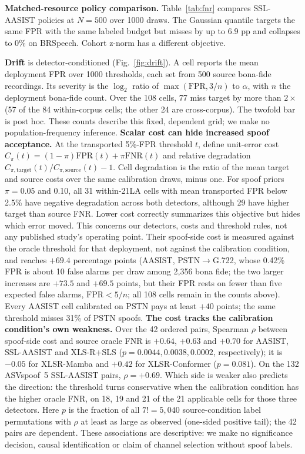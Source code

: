 \documentclass{article}
\begin{document}
\textbf{Matched-resource policy comparison.} Table~\ref{tab:fnr} compares SSL-AASIST policies at $N{=}500$ over 1000 draws. The Gaussian quantile targets the same FPR with the same labeled budget but misses by up to 6.9 pp and collapses to 0\% on BRSpeech. Cohort z-norm has a different objective.

\textbf{Drift} is detector-conditioned (Fig.~\ref{fig:drift}). A cell reports the mean deployment FPR over 1000 thresholds, each set from 500 source bona-fide recordings. Its severity is the $\log_2$ ratio of $\max(\mathrm{FPR},3/n)$ to $\alpha$, with $n$ the deployment bona-fide count. Over the 108 cells, 77 miss target by more than $2\times$ (57 of the 84 within-corpus cells; the other 24 are cross-corpus). The twofold bar is post hoc. These counts describe this fixed, dependent grid; we make no population-frequency inference. \textbf{Scalar cost can hide increased spoof acceptance.} At the transported 5\%-FPR threshold $t$, define unit-error cost $C_\pi(t)=(1-\pi)\mathrm{FPR}(t)+\pi\mathrm{FNR}(t)$ and relative degradation $C_{\pi,\mathrm{target}}(t)/C_{\pi,\mathrm{source}}(t)-1$. Cell degradation is the ratio of the mean target and source costs over the same calibration draws, minus one. For spoof priors $\pi=0.05$ and 0.10, all 31 within-21LA cells with mean transported FPR below 2.5\% have negative degradation across both detectors, although 29 have higher target than source FNR. Lower cost correctly summarizes this objective but hides which error moved. This concerns our detectors, costs and threshold rules, not any published study's operating point. Their spoof-side cost is measured against the oracle threshold for that deployment, not against the calibration condition, and reaches $+69.4$ percentage points (AASIST, PSTN$\to$G.722, whose 0.42\% FPR is about 10 false alarms per draw among 2,356 bona fide; the two larger increases are $+73.5$ and $+69.5$ points, but their FPR rests on fewer than five expected false alarms, $\mathrm{FPR}<5/n$; all 108 cells remain in the counts above). Every AASIST cell calibrated on PSTN pays at least $+40$ points; the same threshold misses 31\% of PSTN spoofs. \textbf{The cost tracks the calibration condition's own weakness.} Over the 42 ordered pairs, Spearman $\rho$ between spoof-side cost and source oracle FNR is $+0.64$, $+0.63$ and $+0.70$ for AASIST, SSL-AASIST and XLS-R+SLS ($p=0.0044,0.0038,0.0002$, respectively); it is $-0.05$ for XLSR-Mamba and $+0.42$ for XLSR-Conformer ($p=0.081$). On the 132 ASVspoof~5 SSL-AASIST pairs, $\rho=+0.69$. Which side is weaker also predicts the direction: the threshold turns conservative when the calibration condition has the higher oracle FNR, on 18, 19 and 21 of the 21 applicable cells for those three detectors. Here $p$ is the fraction of all $7!=5{,}040$ source-condition label permutations with $\rho$ at least as large as observed (one-sided positive tail); the 42 pairs are dependent. These associations are descriptive: we make no significance decision, causal identification or claim of channel selection without spoof labels.
\end{document}
